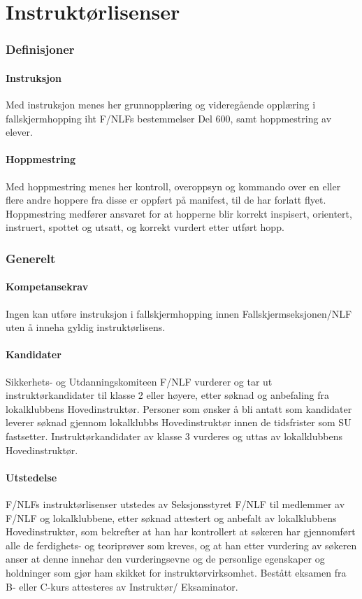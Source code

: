 \part{Instruktørlisenser}
\setcounter{section}{399}

\section{Definisjoner}
\subsection{Instruksjon}
Med instruksjon menes her grunnopplæring og videregående opplæring i fallskjermhopping iht F/NLFs bestemmelser Del 600, samt hoppmestring av elever.

\subsection{Hoppmestring}
Med hoppmestring menes her kontroll, overoppsyn og kommando over en eller flere andre hoppere fra disse er oppført på manifest, til de har forlatt flyet. Hoppmestring medfører ansvaret for at hopperne blir korrekt inspisert, orientert, instruert, spottet og utsatt, og korrekt vurdert etter utført hopp.

\section{Generelt}
\subsection{Kompetansekrav}
Ingen kan utføre instruksjon i fallskjermhopping innen Fallskjermseksjonen/NLF uten å inneha gyldig instruktørlisens.

\subsection{Kandidater}
Sikkerhets- og Utdanningskomiteen F/NLF vurderer og tar ut instruktørkandidater til klasse 2 eller høyere, etter søknad og anbefaling fra lokalklubbens Hovedinstruktør. Personer som ønsker å bli antatt som kandidater leverer søknad gjennom lokalklubbs Hovedinstruktør innen de tidsfrister som SU fastsetter. Instruktørkandidater av klasse 3 vurderes og uttas av lokalklubbens Hovedinstruktør.

\subsection{Utstedelse}
F/NLFs instruktørlisenser utstedes av Seksjonsstyret F/NLF til medlemmer av F/NLF og lokalklubbene, etter søknad attestert og anbefalt av lokalklubbens Hovedinstruktør, som bekrefter at han har kontrollert at søkeren har gjennomført alle de ferdighets- og teoriprøver som kreves, og at han etter vurdering av søkeren anser at denne innehar den vurderingsevne og de personlige egenskaper og holdninger som gjør ham skikket for instruktørvirksomhet. Bestått eksamen fra B- eller C-kurs attesteres av Instruktør/ Eksaminator.

